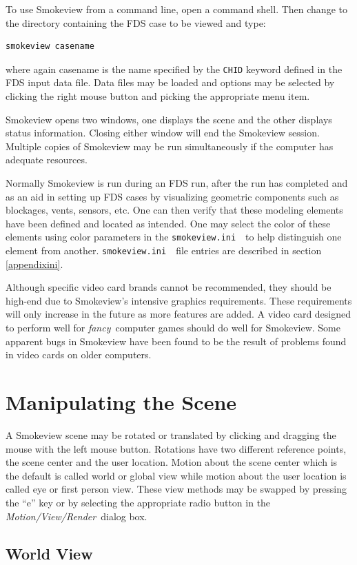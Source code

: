 \documentclass[11pt,twoside]{book}
\newcommand{\svini}{{\tt smokeview.ini}\ }
\begin{document}
To use Smokeview from a command line, open a command shell. Then
change to the directory containing the FDS case to be viewed and
type:
\begin{lstlisting}
smokeview casename
\end{lstlisting}
where again casename is the name specified by the {\tt CHID}
keyword defined in the FDS input data file. Data files may be
loaded and options may be selected by clicking the right mouse
button and picking the appropriate menu item.


Smokeview opens two windows, one displays the scene and the other
displays status information. Closing either window will end the
Smokeview session.  Multiple copies of Smokeview may be run
simultaneously if the computer has adequate resources.

Normally Smokeview is run during an FDS run, after the run has
completed and as an aid in setting up FDS cases by visualizing
geometric components such as blockages, vents, sensors, etc. One
can then verify that these modeling elements have been defined and
located as intended. One may select the color of these elements
using color parameters in the \svini\ to help distinguish one
element from another. \svini\ file entries are described in
section \ref{appendixini}.

Although specific video card brands cannot be recommended, they
should be high-end due to Smokeview's intensive graphics
requirements. These requirements will only increase in the future
as more features are added.  A video card designed to perform well
for {\em fancy}\ computer games should do well for Smokeview. Some
apparent bugs in Smokeview have been found to be the result of
problems found in video cards on older computers.

\section{Manipulating the Scene}

A Smokeview scene may be rotated or translated by clicking and dragging the mouse with the left mouse button.
Rotations have two different reference
points, the scene center and the user location. Motion about the
scene center which is the default is called world or global view while motion about the
user location is called eye or first person view. These view
methods may be swapped by pressing the ``e'' key or by selecting
the appropriate radio button in the {\em Motion/View/Render}\
dialog box.

\subsection{World View}
\end{document}
